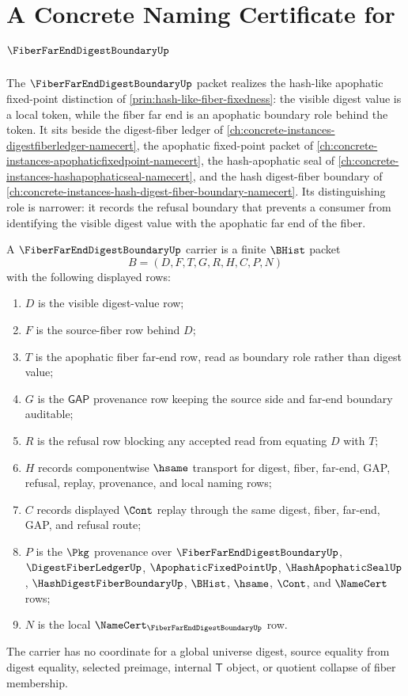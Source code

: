 \chapter{A Concrete Naming Certificate for $\FiberFarEndDigestBoundaryUp$}
\label{ch:concrete-instances-fiber-far-end-digest-boundary-namecert}

The $\FiberFarEndDigestBoundaryUp$ packet realizes the hash-like apophatic fixed-point distinction of \autoref{prin:hash-like-fiber-fixedness}: the visible digest value is a local token, while the fiber far end is an apophatic boundary role behind the token. It sits beside the digest-fiber ledger of \autoref{ch:concrete-instances-digestfiberledger-namecert}, the apophatic fixed-point packet of \autoref{ch:concrete-instances-apophaticfixedpoint-namecert}, the hash-apophatic seal of \autoref{ch:concrete-instances-hashapophaticseal-namecert}, and the hash digest-fiber boundary of \autoref{ch:concrete-instances-hash-digest-fiber-boundary-namecert}. Its distinguishing role is narrower: it records the refusal boundary that prevents a consumer from identifying the visible digest value with the apophatic far end of the fiber.

\begin{definition}
\label{def:fiber-far-end-digest-boundary-carrier}
A $\FiberFarEndDigestBoundaryUp$ carrier is a finite $\BHist$ packet
$$
B=(D,F,T,G,R,H,C,P,N)
$$
with the following displayed rows:
\begin{enumerate}
\item $D$ is the visible digest-value row;
\item $F$ is the source-fiber row behind $D$;
\item $T$ is the apophatic fiber far-end row, read as boundary role rather than digest value;
\item $G$ is the $\mathsf{GAP}$ provenance row keeping the source side and far-end boundary auditable;
\item $R$ is the refusal row blocking any accepted read from equating $D$ with $T$;
\item $H$ records componentwise $\hsame$ transport for digest, fiber, far-end, GAP, refusal, replay, provenance, and local naming rows;
\item $C$ records displayed $\Cont$ replay through the same digest, fiber, far-end, GAP, and refusal route;
\item $P$ is the $\Pkg$ provenance over $\FiberFarEndDigestBoundaryUp$, $\DigestFiberLedgerUp$, $\ApophaticFixedPointUp$, $\HashApophaticSealUp$, $\HashDigestFiberBoundaryUp$, $\BHist$, $\hsame$, $\Cont$, and $\NameCert$ rows;
\item $N$ is the local $\NameCert_{\FiberFarEndDigestBoundaryUp}$ row.
\end{enumerate}
The carrier has no coordinate for a global universe digest, source equality from digest equality, selected preimage, internal $\mathsf{T}$ object, or quotient collapse of fiber membership.
\end{definition}

